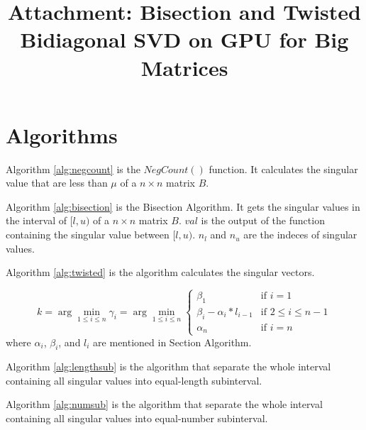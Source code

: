 \documentclass{llncs}
\begin{document}
\title{Attachment: Bisection and Twisted Bidiagonal SVD on GPU for Big Matrices}
\section{Algorithms}
Algorithm \ref{alg:negcount} is the $NegCount()$ function. It calculates the singular value that are less than $\mu$ of a $n\times n$ matrix $B$.


Algorithm \ref{alg:bisection} is the Bisection Algorithm. It gets the singular values in the interval of $[l,u)$ of a $n\times n$ matrix $B$. $val$ is the output of the function containing the singular value between $[l,u)$. $n_l$ and $n_u$ are the indeces of singular values.


\vspace{1in}
Algorithm \ref{alg:twisted} is the algorithm calculates the singular vectors.

\begin{equation}
\label{eq:gamma}
k = \arg \min_{1\le i \le n} \gamma_{i} = \arg \min_{1\le i \le n}
\begin{cases}
\beta_1 & \text{if } i=1 \\
\beta_i - \alpha_i * l_{i-1} & \text{if } 2\le i\le n-1\\
\alpha_n & \text{if } i=n
\end{cases}
\end{equation}
where $\alpha_i$, $\beta_i$, and $l_i$ are mentioned in Section Algorithm.

\vspace{1in}
Algorithm \ref{alg:lengthsub} is the algorithm that separate the whole interval containing all singular values into equal-length subinterval.


Algorithm \ref{alg:numsub} is the algorithm that separate the whole interval containing all singular values into equal-number subinterval.


\vspace{-0.1in}


\end{document}
